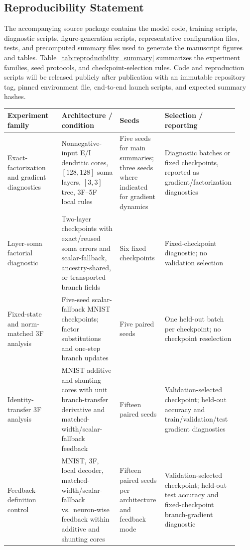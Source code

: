     \subsection{Reproducibility Statement}
    
    The accompanying source package contains the model code, training scripts, diagnostic scripts, figure-generation scripts, representative configuration files, tests, and precomputed summary files used to generate the manuscript figures and tables. Table~\ref{tab:reproducibility_summary} summarizes the experiment families, seed protocols, and checkpoint-selection rules. Code and reproduction scripts will be released publicly after publication with an immutable repository tag, pinned environment file, end-to-end launch scripts, and expected summary hashes.
    
    \begin{table}[htbp]
    \centering
    \scriptsize
    \setlength{\tabcolsep}{3pt}
    \renewcommand{\arraystretch}{1.05}
    \begin{tabular}{@{}L{0.25\linewidth}L{0.27\linewidth}L{0.20\linewidth}L{0.20\linewidth}@{}}
    \toprule
    \textbf{Experiment family} & \textbf{Architecture / condition} & \textbf{Seeds} & \textbf{Selection / reporting} \\
    \midrule
    Exact-factorization and gradient diagnostics & Nonnegative-input E/I dendritic cores, $[128,128]$ soma layers, $[3,3]$ tree, 3F--5F local rules & Five seeds for main summaries; three seeds where indicated for gradient dynamics & Diagnostic batches or fixed checkpoints, reported as gradient/factorization diagnostics \\
    Layer-soma factorial diagnostic & Two-layer checkpoints with exact/reused soma errors and scalar-fallback, ancestry-shared, or transported branch fields & Six fixed checkpoints & Fixed-checkpoint diagnostic; no validation selection \\
    Fixed-state and norm-matched 3F analysis & Five-seed scalar-fallback MNIST checkpoints; factor substitutions and one-step branch updates & Five paired seeds & One held-out batch per checkpoint; no checkpoint reselection \\
    Identity-transfer 3F analysis & MNIST additive and shunting cores with unit branch-transfer derivative and matched-width/scalar-fallback feedback & Fifteen paired seeds & Validation-selected checkpoint; held-out accuracy and train/validation/test gradient diagnostics \\
    Feedback-definition control & MNIST, 3F, local decoder, matched-width/scalar-fallback vs.\ neuron-wise feedback within additive and shunting cores & Fifteen paired seeds per architecture and feedback mode & Validation-selected checkpoint; held-out test accuracy and fixed-checkpoint branch-gradient diagnostic \\

\end{tabular}
\end{table}
